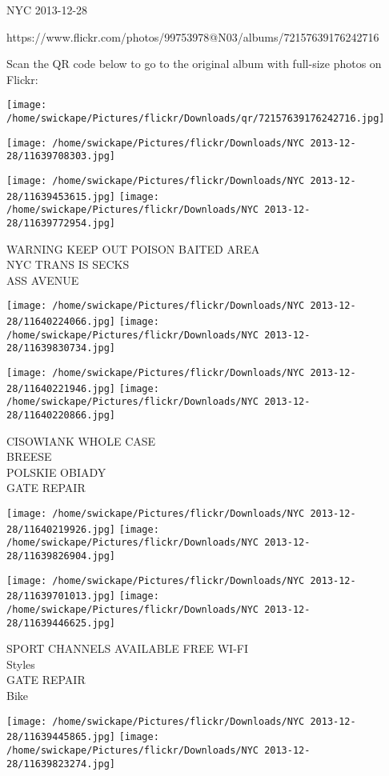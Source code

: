 \documentclass[10pt,letterpaper]{article}
\begin{document}
NYC 2013-12-28

https://www.flickr.com/photos/99753978@N03/albums/72157639176242716

Scan the QR code below to go to the original album with full-size photos on Flickr:

\texttt{[image: /home/swickape/Pictures/flickr/Downloads/qr/72157639176242716.jpg]}
\pagebreak

\texttt{[image: /home/swickape/Pictures/flickr/Downloads/NYC 2013-12-28/11639708303.jpg]}

\vspace{0.25in}
\texttt{[image: /home/swickape/Pictures/flickr/Downloads/NYC 2013-12-28/11639453615.jpg]}
\texttt{[image: /home/swickape/Pictures/flickr/Downloads/NYC 2013-12-28/11639772954.jpg]}

WARNING KEEP OUT POISON BAITED AREA\\
NYC TRANS IS SECKS\\
ASS AVENUE
\pagebreak

\texttt{[image: /home/swickape/Pictures/flickr/Downloads/NYC 2013-12-28/11640224066.jpg]}
\texttt{[image: /home/swickape/Pictures/flickr/Downloads/NYC 2013-12-28/11639830734.jpg]}

\texttt{[image: /home/swickape/Pictures/flickr/Downloads/NYC 2013-12-28/11640221946.jpg]}
\texttt{[image: /home/swickape/Pictures/flickr/Downloads/NYC 2013-12-28/11640220866.jpg]}

CISOWIANK WHOLE CASE\\
BREESE\\
POLSKIE OBIADY\\
GATE REPAIR
\pagebreak

\texttt{[image: /home/swickape/Pictures/flickr/Downloads/NYC 2013-12-28/11640219926.jpg]}
\texttt{[image: /home/swickape/Pictures/flickr/Downloads/NYC 2013-12-28/11639826904.jpg]}

\texttt{[image: /home/swickape/Pictures/flickr/Downloads/NYC 2013-12-28/11639701013.jpg]}
\texttt{[image: /home/swickape/Pictures/flickr/Downloads/NYC 2013-12-28/11639446625.jpg]}

SPORT CHANNELS AVAILABLE FREE WI{-}FI\\
Styles\\
GATE REPAIR\\
Bike
\pagebreak

\texttt{[image: /home/swickape/Pictures/flickr/Downloads/NYC 2013-12-28/11639445865.jpg]}
\texttt{[image: /home/swickape/Pictures/flickr/Downloads/NYC 2013-12-28/11639823274.jpg]}
\end{document}
